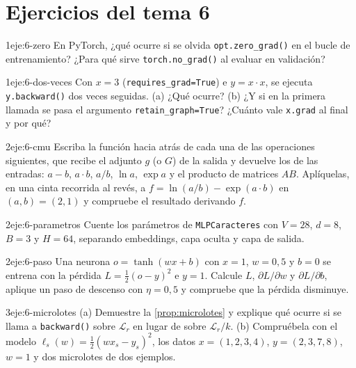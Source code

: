 \section*{Ejercicios del tema 6}

\begin{ejercicio}{1}{eje:6-zero}
En PyTorch, ¿qué ocurre si se olvida \texttt{opt.zero\_grad()} en el bucle de entrenamiento? ¿Para qué sirve \texttt{torch.no\_grad()} al evaluar en validación?
\end{ejercicio}

\begin{ejercicio}{1}{eje:6-dos-veces}
Con $x=3$ (\texttt{requires\_grad=True}) e $y=x\cdot x$, se ejecuta \texttt{y.backward()} dos veces seguidas. (a) ¿Qué ocurre? (b) ¿Y si en la primera llamada se pasa el argumento \texttt{retain\_graph=True}? ¿Cuánto vale \texttt{x.grad} al final y por qué?
\end{ejercicio}

\begin{ejercicio}{2}{eje:6-cmu}
Escriba la función hacia atrás de cada una de las operaciones siguientes, que recibe el adjunto $g$ (o $G$) de la salida y devuelve los de las entradas: $a-b$, $a\cdot b$, $a/b$, $\ln a$, $\exp a$ y el producto de matrices $AB$. Aplíquelas, en una cinta recorrida al revés, a $f=\ln(a/b)-\exp(a\cdot b)$ en $(a,b)=(2,1)$ y compruebe el resultado derivando $f$.
\end{ejercicio}

\begin{ejercicio}{2}{eje:6-parametros}
Cuente los parámetros de \texttt{MLPCaracteres} con $V=28$, $d=8$, $B=3$ y $H=64$, separando embeddings, capa oculta y capa de salida.
\end{ejercicio}

\begin{ejercicio}{2}{eje:6-paso}
Una neurona $o=\tanh(wx+b)$ con $x=1$, $w=0{,}5$ y $b=0$ se entrena con la pérdida $L=\tfrac12(o-y)^{2}$ e $y=1$. Calcule $L$, $\partial L/\partial w$ y $\partial L/\partial b$, aplique un paso de descenso con $\eta=0{,}5$ y compruebe que la pérdida disminuye.
\end{ejercicio}

\begin{ejercicio}{3}{eje:6-microlotes}
(a) Demuestre la \cref{prop:microlotes} y explique qué ocurre si se llama a \texttt{backward()} sobre $\mathcal L_r$ en lugar de sobre $\mathcal L_r/k$. (b) Compruébela con el modelo $\ell_s(w)=\tfrac12(wx_s-y_s)^{2}$, los datos $x=(1,2,3,4)$, $y=(2,3,7,8)$, $w=1$ y dos microlotes de dos ejemplos.
\end{ejercicio}
